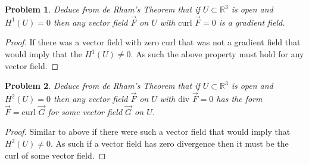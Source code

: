 \documentclass[10pt]{article}
\newcommand{\sk}{\vskip 10mm}
\newcommand{\bb}[1]{\mathbb{#1}}
\theoremstyle{plain}
\newtheorem{problem}{Problem}
\theoremstyle{remark}
\begin{document}
\begin{problem}
  Deduce from de Rham's Theorem that if $U\subset\bb{R}^3$ is open and
  $H^1(U)=0$ then any vector field $\vec{F}$ on $U$ with
  $\text{curl\ }\vec{F}=0$ is a gradient field.
\end{problem}

\begin{proof}
  If there was a vector field with zero curl that was not a gradient
  field that would imply that the $H^1(U)\neq 0$. As such the above property
  must hold for any vector field.
\end{proof}

\sk

\begin{problem}
  Deduce from de Rham's Theorem that if $U\subset\bb{R}^3$ is open and
  $H^2(U)=0$ then any vector field $\vec{F}$ on $U$ with $\text{div\ }\vec{F}=0$
  has the form $\vec{F}=\text{curl\ }\vec{G}$ for some vector field
  $\vec{G}$ on $U$.
\end{problem}

\begin{proof}
  Similar to above if there were such a vector field that would imply that
  $H^2(U)\neq 0$. As such if a vector field has zero divergence then it
  must be the curl of some vector field.
\end{proof}

\end{document}
